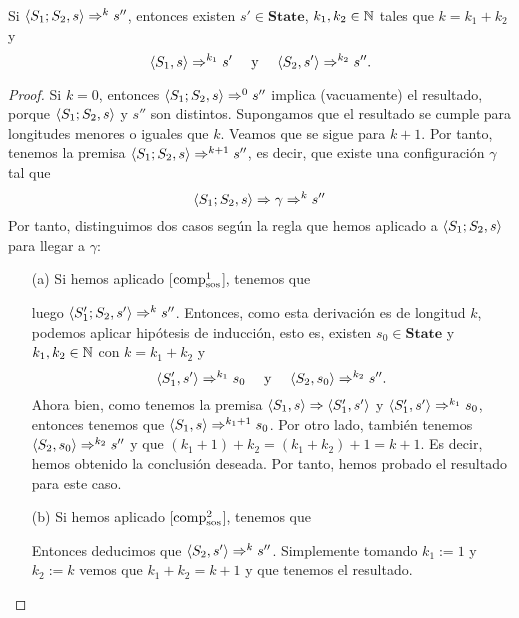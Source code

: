 \begin{lema}\label{lemasos1}
Si $\la{S_1;S_2}{s}\dto^k s''$, entonces existen $s'\in \mathbf{State}$, $k_1, k_2 \in \N$ tales que $k = k_1 + k_2$ y $$\la{S_1}{s}\dto^{k_1}s' \quad \text{ y }\quad \la{S_2}{s'}\dto^{k_2}s''.$$
\end{lema}
\begin{proof}
Si $k=0$, entonces $\la{S_1;S_2}{s}\dto^0 s''$ implica (vacuamente) el resultado, porque $\la{S_1;S_2}{s}$ y $s''$ son distintos. Supongamos que el resultado se cumple para longitudes menores o iguales que $k$. Veamos que se sigue para $k+1$. Por tanto, tenemos la premisa $\la{S_1;S_2}{s}\dto^{k+1} s''$, es decir, que existe una configuración $\gamma$ tal que
$$\la{S_1;S_2}{s}\dto \gamma \dto^{k} s''$$
Por tanto, distinguimos dos casos según la regla que hemos aplicado a $\la{S_1;S_2}{s}$ para llegar a $\gamma$:
\begin{itemize}
    \item[(a)] Si hemos aplicado [$\nn{comp}^1_\nn{sos}$], tenemos que
\begin{prooftree}
\end{prooftree}
luego $\la{S_1'; S_2}{s'} \dto^k s''$. Entonces, como esta derivación es de longitud $k$, podemos aplicar hipótesis de inducción, esto es, existen $s_0 \in \mathbf{State}$ y $k_1, k_2 \in \N$ con $k = k_1 + k_2$ y 
$$\la{S_1'}{s'}\dto^{k_1}s_0 \quad \text{ y }\quad \la{S_2}{s_0}\dto^{k_2}s''.$$
Ahora bien, como tenemos la premisa $\la{S_1}{s} \dto \la{S_1'}{s'}$ y $\la{S_1'}{s'}\dto^{k_1}s_0$, entonces tenemos que $\la{S_1}{s}\dto^{k_1 + 1}s_0$. Por otro lado, también tenemos $\la{S_2}{s_0}\dto^{k_2}s''$ y que $(k_1 + 1) + k_2 = (k_1 + k_2)+1 = k+1$. Es decir, hemos obtenido la conclusión deseada. Por tanto, hemos probado el resultado para este caso.

\item[(b)] Si hemos aplicado [$\nn{comp}^2_\nn{sos}$], tenemos que
\begin{prooftree}
\end{prooftree}
Entonces deducimos que $\la{S_2}{s'} \dto^{k}s''$. Simplemente tomando $k_1 := 1$ y $k_2 := k$ vemos que $k_1+k_2 = k+1$ y que tenemos el resultado.
\end{itemize}
\end{proof}

